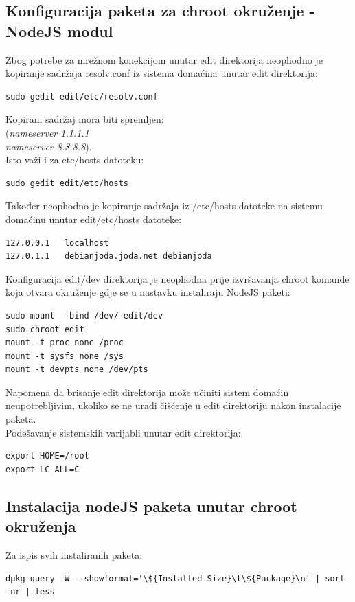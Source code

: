 \documentclass[12pt,vi]{mitthesis}
\begin{document}
\subsection*{Konfiguracija paketa za chroot okruženje - NodeJS modul}
\indent
Zbog potrebe za mrežnom konekcijom unutar edit direktorija neophodno je kopiranje sadržaja resolv.conf\cite[str.~809, str.~186]{linux-bible} iz sistema domaćina unutar edit direktorija:
\begin{lstlisting}[style=BashInputStyle]
sudo gedit edit/etc/resolv.conf
\end{lstlisting}
Kopirani sadržaj mora biti spremljen:\\
(\textit{nameserver 1.1.1.1 \\
nameserver 8.8.8.8}).\\
\noindent
Isto važi i za etc/hosts\cite[str.~186]{linux-bible} datoteku:
\begin{lstlisting}[style=BashInputStyle]
sudo gedit edit/etc/hosts
\end{lstlisting}
Također neophodno je kopiranje sadržaja iz /etc/hosts datoteke na sistemu domaćinu unutar edit/etc/hosts datoteke:
\begin{lstlisting}
127.0.0.1	localhost
127.0.1.1	debianjoda.joda.net	debianjoda
\end{lstlisting}

\noindent
Konfiguracija edit/dev direktorija je neophodna prije izvršavanja chroot komande koja otvara okruženje gdje se u nastavku instaliraju NodeJS paketi:
\begin{lstlisting}[style=BashInputStyle]
sudo mount --bind /dev/ edit/dev
sudo chroot edit
mount -t proc none /proc
mount -t sysfs none /sys
mount -t devpts none /dev/pts
\end{lstlisting}
Napomena da brisanje edit direktorija može učiniti sistem domaćin neupotrebljivim, ukoliko se ne uradi čišćenje u edit direktoriju nakon instalacije paketa.\\
\noindent
Podešavanje sistemskih varijabli unutar edit direktorija:
\begin{lstlisting}[style=BashInputStyle]
export HOME=/root
export LC_ALL=C
\end{lstlisting}

\subsection*{Instalacija nodeJS paketa unutar chroot okruženja}
\indent
Za ispis svih instaliranih paketa:
\begin{lstlisting}[style=BashInputStyle]
dpkg-query -W --showformat='\${Installed-Size}\t\${Package}\n' | sort -nr | less
\end{lstlisting}
\end{document}
